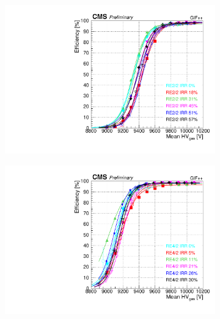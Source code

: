 	\begin{figure}[H]
    	\begin{subfigure}{0.5\linewidth}
			\centering
    		\includegraphics[width = \linewidth]{fig/chapt5/efficiency_vs_HVgas_RE2_2-IRR.pdf}
        	\caption{\label{fig:GIFpp_eff_vs_HVgas:A}}
    	\end{subfigure}
    	\begin{subfigure}{0.5\linewidth}
			\centering
    		\includegraphics[width = \linewidth]{fig/chapt5/efficiency_vs_HVgas_RE4_2-IRR.pdf}
        	\caption{\label{fig:GIFpp_eff_vs_HVgas:B}}
    	\end{subfigure}
    	\begin{subfigure}{0.5\linewidth}
			\centering

\end{subfigure}
\end{figure}
